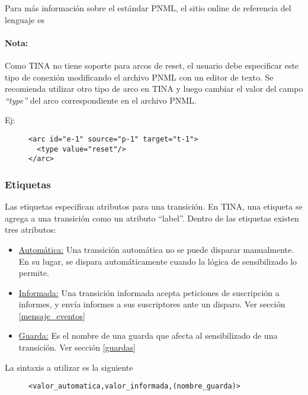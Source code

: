 Para más información sobre el estándar PNML, el sitio online de referencia del
lenguaje es \cite{PnmlSite}

\begin{framed}
\paragraph{Nota:}
Como TINA no tiene soporte para arcos de reset, el usuario debe especificar
este tipo de conexión modificando el archivo PNML con un editor de texto.
Se recomienda utilizar otro tipo de arco en TINA y luego cambiar el valor del
campo \textit{``type''} del arco correspondiente en el archivo PNML.

Ej:
\begin{figure}[H]
\centering
\begin{verbatim}
<arc id="e-1" source="p-1" target="t-1">
  <type value="reset"/>
</arc>
\end{verbatim}
\end{figure}
\end{framed}

\subsubsection{Etiquetas}

Las etiquetas especifican atributos para una transición. En TINA, una etiqueta
se agrega a una transición como un atributo ``label''.
Dentro de las etiquetas existen tres atributos:

\begin{itemize}
    \item \underline{Automática:} Una transición automática no se puede disparar
    manualmente. En su lugar, se dispara automáticamente cuando la lógica de
    sensibilizado lo permite.
    \item \underline{Informada:} Una transición informada acepta peticiones de
    suscripción a informes, y envía informes a sus suscriptores ante un disparo.
    Ver sección \ref{mensaje_eventos}
    \item \underline{Guarda:} Es el nombre de una guarda que afecta
    al sensibilizado de una transición. Ver sección \ref{guardas}
\end{itemize}

La sintaxis a utilizar es la siguiente

\begin{figure}[H]
\centering
\begin{verbatim}
<valor_automatica,valor_informada,(nombre_guarda)>
\end{verbatim}
\end{figure}

